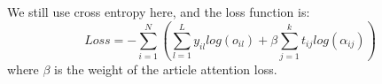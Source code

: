 
We still use cross entropy here, and the loss function is:
\begin{equation}
\label{final_loss}
Loss = -\sum_{i=1}^N(\sum_{l=1}^L{y_{il} log(o_{il})} + \beta \sum_{j=1}^k{t_{ij} log(\alpha_{ij})})
\end{equation}
where $\beta$ is the weight of the article attention loss.




